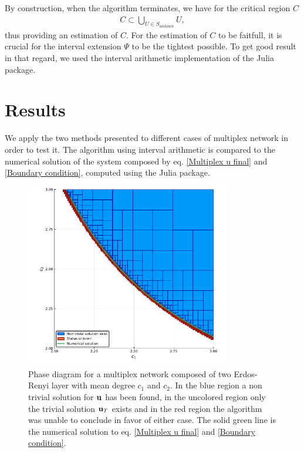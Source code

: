 \documentclass[
11pt, %
english, %
singlespacing, %
nolistspacing, %
liststotoc, %
headsepline, %
]{MastersDoctoralThesis} %
\begin{document}
By construction, when the algorithm terminates, we have for the critical region $C$
\begin{align}
	C \subset \bigcup_{U \in S_{unkown}} U,
\end{align}
thus providing an estimation of $C$. For the estimation of $C$ to be faitfull, it is crucial for the interval extension $\Psi$ to be the tightest possible. To get good result in that regard, we used the interval arithmetic implementation of the  Julia package\missingref{}.

\section{Results}

We apply the two methods presented to different cases of multiplex network in order to test it. The algorithm using interval arithmetic is compared to the numerical solution of the system composed by eq. \eqref{Multiplex u final} and \eqref{Boundary condition}, computed using the  Julia package.


\begin{figure}
	\includegraphics[width=0.8\textwidth]{two_layers_erdos_renyi_boundary.pdf}
	\caption{Phase diagram for a multiplex network composed of two Erdos-Renyi layer with mean degree $c_1$ and $c_2$. In the blue region a non trivial solution for $\boldsymbol{\mathrm{u}}$ has been found, in the uncolored region only the trivial solution $\boldsymbol{\mathrm{u}}_T$ exists and in the red region the algorithm was unable to conclude in favor of either case. The solid green line is the numerical solution to eq. \eqref{Multiplex u final} and \eqref{Boundary condition}.}
	\label{Figure: Regions and boundary}
\end{figure}
\end{document}
